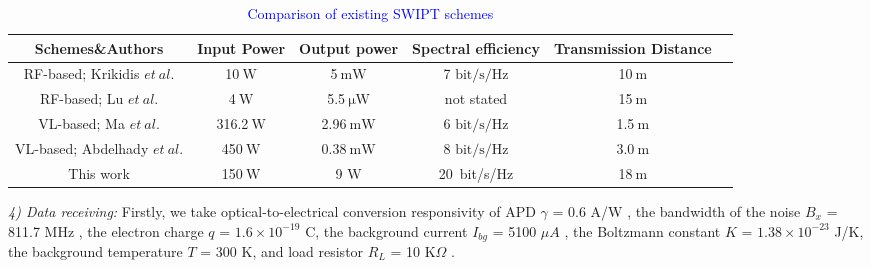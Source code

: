 \documentclass{IEEEtran}
\begin{document}
\begin{table*}[t]
	\centering
	\caption{\textcolor{blue}{Comparison of existing SWIPT schemes}}
	\label{t3}
	\begin{tabular}{cccccc}
		\hline
		\textbf{Schemes\&Authors} &\textbf{Input Power}&\textbf{Output power}&\textbf{Spectral efficiency} &\textbf{Transmission Distance}\\
		\hline 
RF-based; Krikidis $et~al.$ \cite{krikidis2014simultaneous}& 10$\mathrm{~W}$ & 5$\mathrm{~mW}$ & 7 $\mathrm{bit/s} / \mathrm{Hz}$ &  10$\mathrm{~m}$  \\
RF-based; Lu $et~al.$ \cite{lu2014dynamic}& 4$\mathrm{~W}$ & 5.5$\mathrm{~\mu W}$ & not stated &    15$\mathrm{~m}$  \\
VL-based; Ma $et~al.$ \cite{ma2019simultaneous}& 316.2$\mathrm{~W}$ & 2.96$\mathrm{~mW}$ & 6 $ \mathrm{bit/s} / \mathrm{Hz}$  & 1.5$ \mathrm{~m}$  \\
VL-based; Abdelhady $et~al.$ \cite{abdelhady2020spectral}& 450$\mathrm{~W}$ & 0.38$\mathrm{~mW}$ & 8 $\mathrm{bit/s} / \mathrm{Hz}$ &  3.0$\mathrm{~m}$  \\
This work & 150$\mathrm{~W}$ &9 W &20~bit/s/Hz&   18$\mathrm{~m}$  \\
		\hline
	\end{tabular}     
\end{table*}
\emph{4) Data receiving:} 
Firstly, we take optical-to-electrical conversion responsivity of APD $\gamma$ = 0.6 A/W \cite{47}, the bandwidth of the noise $B_x$ = 811.7 MHz \cite{48}, the electron charge $q$ = $1.6 \times 10^{-19}$ C, the background current $I_{bg}$ = 5100 $\mu A$ \cite{49}, the Boltzmann constant $K$ = $1.38 \times 10^{-23}$ J/K, the background temperature $T$ = 300 K, and load resistor $R_L$ = 10 K$\Omega$ \cite{46}. 
\end{document}
